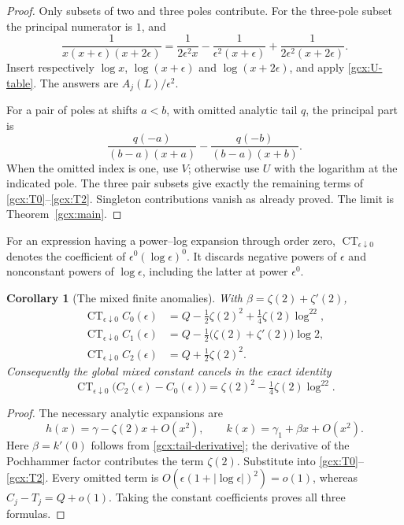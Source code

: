 \documentclass[11pt]{article}
\numberwithin{equation}{section}
\theoremstyle{plain}
\newtheorem{corollary}[theorem]{Corollary}
\theoremstyle{definition}
\theoremstyle{remark}
\DeclareMathOperator{\CT}{CT}
\begin{document}
\begin{proof}
Only subsets of two and three poles contribute.  For the three-pole
subset the principal numerator is $1$, and
\[
 \frac1{x(x+\epsilon)(x+2\epsilon)}
 =\frac1{2\epsilon^2x}-\frac1{\epsilon^2(x+\epsilon)}
          +\frac1{2\epsilon^2(x+2\epsilon)}.
\]
Insert respectively $\log x$, $\log(x+\epsilon)$ and
$\log(x+2\epsilon)$, and apply \eqref{gcx:U-table}.  The answers are
$A_j(L)/\epsilon^2$.

For a pair of poles at shifts $a<b$, with omitted analytic tail $q$,
the principal part is
\[
 \frac{q(-a)}{(b-a)(x+a)}
    -\frac{q(-b)}{(b-a)(x+b)}.
\]
When the omitted index is one, use $V$; otherwise use $U$ with the
logarithm at the indicated pole.  The three pair subsets give exactly
the remaining terms of \eqref{gcx:T0}--\eqref{gcx:T2}.  Singleton
contributions vanish as already proved.  The limit is
Theorem~\ref{gcx:main}.
\end{proof}

For an expression having a power--log expansion through order zero,
$\CT_{\epsilon\downarrow0}$ denotes the coefficient of
$\epsilon^0(\log\epsilon)^0$.  It discards negative powers of $\epsilon$
and nonconstant powers of $\log\epsilon$, including the latter at power
$\epsilon^0$.

\begin{corollary}[The mixed finite anomalies]\label{gcx:CT-values}
With $\beta=\zeta(2)+\zeta'(2)$,
\begin{align}
 \CT_{\epsilon\downarrow0}C_0(\epsilon)
      &=Q-\tfrac12\zeta(2)^2+\tfrac14\zeta(2)\log^22,
 \label{gcx:CT0}\\
 \CT_{\epsilon\downarrow0}C_1(\epsilon)
      &=Q-\tfrac12\bigl(\zeta(2)+\zeta'(2)\bigr)\log2,
 \label{gcx:CT1}\\
 \CT_{\epsilon\downarrow0}C_2(\epsilon)
      &=Q+\tfrac12\zeta(2)^2.
 \label{gcx:CT2}
\end{align}
Consequently the global mixed constant cancels in the exact identity
\begin{equation}\label{gcx:CT-difference}
 \CT_{\epsilon\downarrow0}\bigl(C_2(\epsilon)-C_0(\epsilon)\bigr)
       =\zeta(2)^2-\tfrac14\zeta(2)\log^22.
\end{equation}
\end{corollary}

\begin{proof}
The necessary analytic expansions are
\[
 h(x)=\gamma-\zeta(2)x+O(x^2),\qquad
 k(x)=\gamma_1+\beta x+O(x^2).
\]
Here $\beta=k'(0)$ follows from \eqref{gcx:tail-derivative}; the derivative
of the Pochhammer factor contributes the term $\zeta(2)$.
Substitute into \eqref{gcx:T0}--\eqref{gcx:T2}.  Every omitted term is
$O(\epsilon(1+|\log\epsilon|)^2)=o(1)$, whereas
$C_j-T_j=Q+o(1)$.  Taking the constant coefficients proves all three
formulas.
\end{proof}
\end{document}
